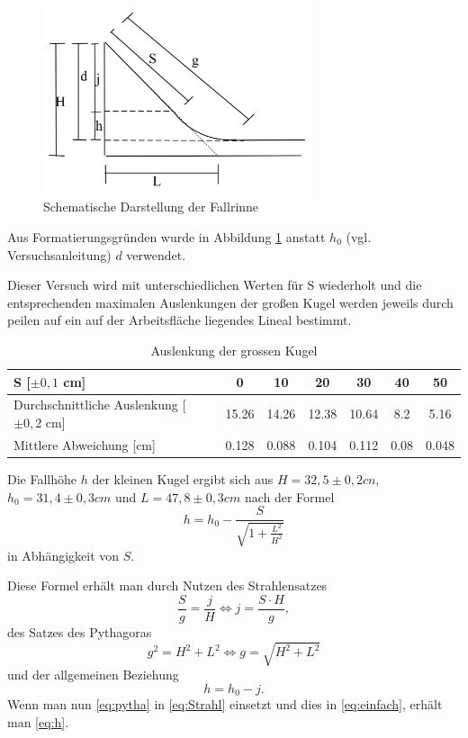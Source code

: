 \begin{figure}[htbp] 
  \centering
	\includegraphics[width=0.7\textwidth]{Fallrinne.png}
	\caption{Schematische Darstellung der Fallrinne}
  \label{fig:Fallrinne}
\end{figure}

Aus Formatierungsgründen wurde in Abbildung \ref{fig:Fallrinne} anstatt $h_0$ (vgl. Versuchsanleitung) $d$ verwendet.

Dieser Versuch wird mit unterschiedlichen Werten für S wiederholt und die entsprechenden maximalen Auslenkungen der großen Kugel werden jeweils durch peilen auf ein auf der Arbeitsfläche liegendes Lineal bestimmt.

\begin{table}[H]
  \centering
  \begin{tabular}{l | c | c | c | c | c | c}
    S [$\pm 0,1$ cm]  & \num{0} & \num{10} & \num{20} & \num{30} & \num{40} & \num{50}\\ \hline
   Durchschnittliche Auslenkung [$\pm 0,2$ cm] & \num{15,26} & \num{14,26} & \num{12,38} & \num{10,64} & \num{8,2} & \num{5,16} \\
   Mittlere Abweichung [cm] & \num{0,128} &\num{0,088} & \num{0,104} & \num{0,112} & \num{0,08} & \num{0,048}
    
  \end{tabular}
  \caption{Auslenkung der grossen Kugel}
  \label{tab:auslenkgross}
\end{table}

Die Fallhöhe $h$ der kleinen Kugel ergibt sich aus $H=32,5 \pm0,2 cn$, $h_0=31,4 \pm 0,3cm$ und $L= 47,8 \pm 0,3cm$ nach der Formel
\begin{equation}
\label{eq:h}
h=h_0-\frac{S}{\sqrt{1+\frac{L^2}{H^2}}}
\end{equation}
in Abhängigkeit von $S$.

Diese Formel erhält man durch Nutzen des Strahlensatzes
\begin{equation}
\frac{S}{g}=\frac{j}{H} \iff j=\frac{S\cdot H}{g},
\label{eq:Strahl}
\end{equation}
des Satzes des Pythagoras
\begin{equation}
g^2=H^2+L^2 \iff g=\sqrt{H^2+L^2}
\label{eq:pytha}
\end{equation}
und der allgemeinen Beziehung
\begin{equation}
h=h_0-j.
\label{eq:einfach}
\end{equation}
Wenn man nun \ref{eq:pytha} in \ref{eq:Strahl} einsetzt und dies in \ref{eq:einfach}, erhält man \ref{eq:h}.
\\

